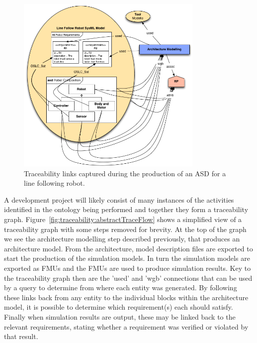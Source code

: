 
\begin{figure}[htbp]
	\centering
	\includegraphics[width=0.8\textwidth]{figures/Traceability/step02}
\caption{Traceability links captured during the production of an ASD for a line following robot.}\label{fig:traceability:step02}
\end{figure}


A development project will likely consist of many instances of the activities identified in the ontology being performed and together they form a traceability graph.  Figure~\ref{fig:traceability:abstractTraceFlow} shows a simplified view of a traceability graph with some steps removed for brevity.  At the top of the graph we see the architecture modelling step described previously, that produces an architecture model.  From the architecture, model description files are exported to start the production of the simulation models.  In turn the simulation models are exported as FMUs and the FMUs are used to produce simulation results.  Key to the traceability graph then are the 'used' and 'wgb' connections that can be used by a query to determine from where each entity was generated.  By following these links back from any entity to the individual blocks within the architecture model, it is possible to determine which requirement(s) each should satisfy.  Finally when simulation results are output, these may be linked back to the relevant requirements, stating whether a requirement was verified or violated by that result.

